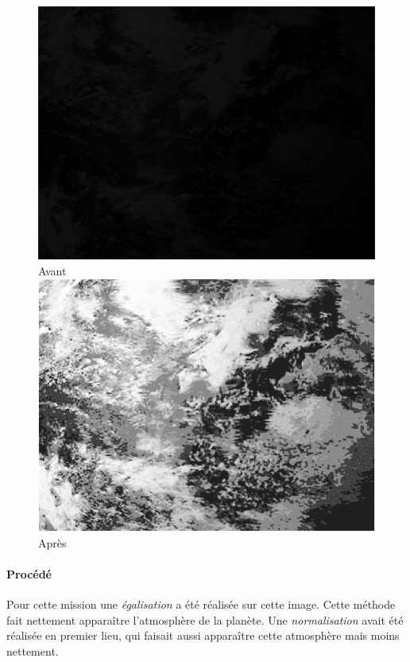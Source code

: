 	\begin{figure}[h]
	\centering
		\begin{multicols}{2}
		\includegraphics[scale=0.525]{images/Gliese667Cc.png}
		Avant
		\includegraphics[scale=0.525]{images/Gliese667CcAFTER.png}
		Après
		\end{multicols}
	\end{figure}
	\vspace{-0.9cm}

		\paragraph{Procédé}	
			Pour cette mission une \emph{égalisation} a été réalisée sur cette image. Cette méthode fait nettement apparaître l'atmosphère de la planète. Une \emph{normalisation} avait été réalisée en premier lieu, qui faisait aussi apparaître cette atmosphère mais moins nettement.